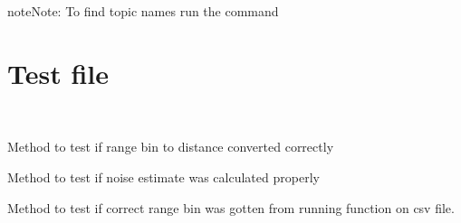 \documentclass[letterpaper,10pt,english]{sphinxmanual}
\begin{document}
\begin{sphinxadmonition}{note}{Note:}
To find topic names run the command 
\end{sphinxadmonition}


\section{Test file}
\label{\detokenize{Test:module-test}}\label{\detokenize{Test:test-file}}\label{\detokenize{Test::doc}}

\begin{fulllineitems}
\label{\detokenize{Test:test.TestParser}}~

\begin{fulllineitems}
\label{\detokenize{Test:test.TestParser.X4_Threshold_bin_to_distance}}
Method to test if range bin to distance converted correctly

\end{fulllineitems}


\begin{fulllineitems}
\label{\detokenize{Test:test.TestParser.X4_Threshold_noise_estimate}}
Method to test if noise estimate was calculated properly

\end{fulllineitems}


\begin{fulllineitems}
\label{\detokenize{Test:test.TestParser.X4_Threshold_range_finder}}
Method to test if correct range bin was gotten from running function on csv file.


\end{fulllineitems}
\end{fulllineitems}
\end{document}
